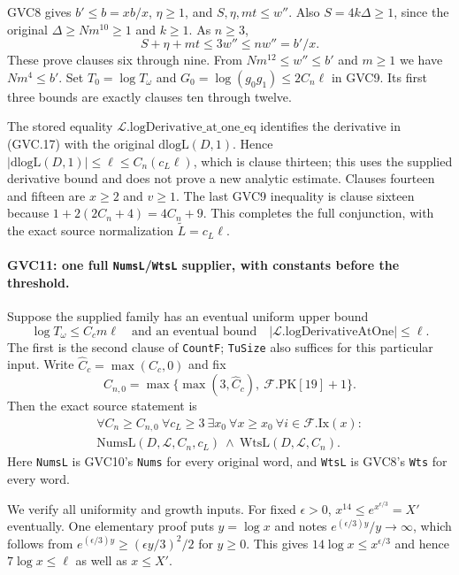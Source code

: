 GVC8 gives $b'\le b=xb/x$, $\eta\ge1$, and
$S,\eta,mt\le w''$.
Also $S=4k\Delta\ge1$, since the original
$\Delta\ge Nm^{10}\ge1$ and $k\ge1$.
As $n\ge3$,
\[
              S+\eta+mt\le3w''\le n w''=b'/x .
\]
These prove clauses six through nine.
From $Nm^{12}\le w''\le b'$ and $m\ge1$ we have
$Nm^4\le b'$.
Set $T_0=\log T_\omega$ and
$G_0=\log(g_0g_1)\le2C_n\ell$ in GVC9.
Its first three bounds are exactly clauses ten through twelve.

The stored equality
$\mathcal L.\mathrm{logDerivative\_at\_one\_eq}$ identifies
the derivative in (GVC.17) with the original $\mathrm{dlogL}(D,1)$.
Hence
$|\mathrm{dlogL}(D,1)|\le\ell\le C_n(c_L\ell)$,
which is clause thirteen; this uses the supplied derivative
bound and does not prove a new analytic estimate.
Clauses fourteen and fifteen are $x\ge2$ and $v\ge1$.
The last GVC9 inequality is clause sixteen because
$1+2(2C_n+4)=4C_n+9$.
This completes the full conjunction, with the exact source
normalization $\widetilde L=c_L\ell$.

\paragraph{GVC11: one full \texttt{NumsL}/\texttt{WtsL} supplier, with constants before the threshold.}
\label{claim:GVC11}
Suppose the supplied family has an eventual uniform upper bound
\[
 \log T_\omega\le C_cm\ell
 \quad\text{and an eventual bound}\quad
 |\mathcal L.\mathrm{logDerivativeAtOne}|\le\ell .
                                                               \tag{GVC.18}
\]
The first is the second clause of \texttt{CountF};
\texttt{TuSize} also suffices for this particular input.
Write $\widehat C_c=\max(C_c,0)$ and fix
\[
 C_{n,0}=
 \max\bigl\{\max(3,\widehat C_c),\
                    \mathcal F.\mathrm{PK}[19]+1\bigr\}.
                                                               \tag{GVC.19}
\]
Then the exact source statement is
\[
 \boxed{\begin{gathered}
 \forall C_n\ge C_{n,0}\ \forall c_L\ge3\
 \exists x_0\ \forall x\ge x_0\ \forall i\in\mathcal F.\mathrm{Ix}(x):\\
 \mathrm{NumsL}(D,\mathcal L,C_n,c_L)
 \ \wedge\ \mathrm{WtsL}(D,\mathcal L,C_n).
 \end{gathered}}                                             \tag{GVC.20}
\]
Here \texttt{NumsL} is GVC10's \texttt{Nums} for every original
word, and \texttt{WtsL} is GVC8's \texttt{Wts} for every word.

We verify all uniformity and growth inputs.
For fixed $\epsilon>0$, $x^{14}\le e^{x^{\epsilon/3}}=X'$
eventually. One elementary proof puts $y=\log x$ and notes
$e^{(\epsilon/3)y}/y\longrightarrow\infty$, which follows from
$e^{(\epsilon/3)y}\ge(\epsilon y/3)^2/2$ for $y\ge0$.
This gives $14\log x\le x^{\epsilon/3}$ and hence
$7\log x\le\ell$ as well as $x\le X'$.

